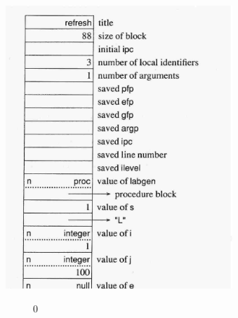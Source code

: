 \bigskip


\bigskip


\ \  \includegraphics[width=3.4193in,height=4.2016in]{ib-img/ib-img131.jpg} 


\ \ \ \ \ \  \ \ 0
